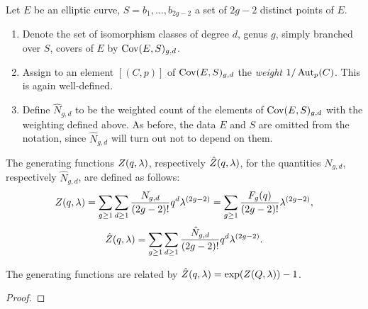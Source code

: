 \begin{defi} Let $E$ be an elliptic curve, $S={b_1,\dotsc,b_{2g-2}}$ a set of $2g-2$ distinct points of $E$.
 \begin{enumerate}
  \item Denote the set of isomorphism classes of degree $d$, genus $g$, simply branched over $S$, covers of $E$ by $\operatorname{Cov}(E,S)_{g,d}$.
 
  \item Assign to an element $[(C,p)]$ of $\operatorname{Cov}(E,S)_{g,d}$ the \emph{weight} $1/\operatorname{Aut}_p(C)$. This is again well-defined.
 
  \item Define $\hat{N}_{g,d}$ to be the weighted count of the elements of $\operatorname{Cov}(E,S)_{g,d}$ with the weighting defined above. As    before, the data $E$ and $S$ are omitted from the notation, since $\hat{N}_{g,d}$ will turn out not to depend on them. 
 \end{enumerate}
\end{defi}

\begin{defi}
 The generating functions $Z(q,\lambda)$, respectively $\hat{Z}(q,\lambda)$, for the quantities $N_{g,d}$, respectively $\hat{N}_{g,d}$, are defined as follows:
 \[Z(q,\lambda) = \sum_{g\geq 1}\sum_{d\geq 1} \frac{N_{g,d}}{(2g-2)!}q^d\lambda^{(2g-2)} 
 = \sum_{g\geq 1}\frac{F_g(q)}{(2g-2)!}\lambda^{(2g-2)},\]
 \[\hat{Z}(q,\lambda) = \sum_{g\geq 1}\sum_{d\geq 1} \frac{\hat{N}_{g,d}}{(2g-2)!}q^d\lambda^{(2g-2)}.\]
\end{defi}

\begin{lemma}
 The generating functions are related by $\hat{Z}(q,\lambda) = \exp(Z(Q,\lambda)) - 1$.
\end{lemma}

\begin{proof}
\end{proof}


